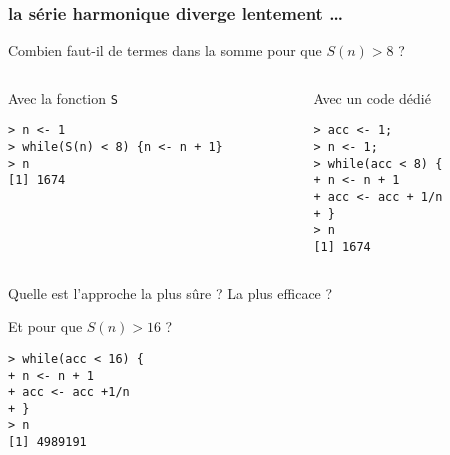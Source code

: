 \documentclass[10pt]{beamer}
\begin{document}
\begin{frame}[fragile]
  \frametitle{la série harmonique diverge lentement \dots}

  \begin{block}{Combien faut-il de termes dans la somme pour que $S(n) > 8$ ?}

\begin{columns}[t]
\begin{column}{0.55\textwidth}
  \begin{block}{Avec la fonction \texttt{S}}
    \begin{lstlisting}[style=block]
> n <- 1
> while(S(n) < 8) {n <- n + 1}
> n
[1] 1674
\end{lstlisting}
  \end{block}
\end{column}
\begin{column}{0.45\textwidth}
  \begin{block}{Avec un code dédié}
    \begin{lstlisting}[style=block]
> acc <- 1;
> n <- 1;
> while(acc < 8) {
+ n <- n + 1
+ acc <- acc + 1/n
+ }
> n
[1] 1674
\end{lstlisting}
\end{block}
\end{column}
\end{columns}
Quelle est l'approche la plus sûre ? La plus efficace ?
\end{block}

\begin{block}{Et pour que $S(n) > 16$ ?}

\begin{lstlisting}[style=block]
> while(acc < 16) {
+ n <- n + 1
+ acc <- acc +1/n
+ }
> n
[1] 4989191
\end{lstlisting}
\end{block}
\end{frame}



\end{document}
